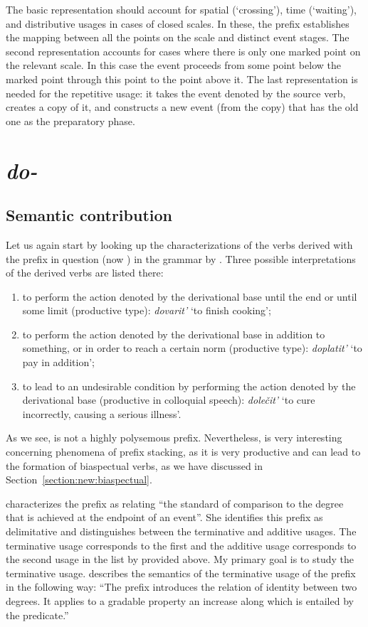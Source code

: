 The basic representation should account for spatial (`crossing'), time (`waiting'), and distributive usages in cases of closed scales. In these, the prefix establishes the mapping between all the points on the scale and distinct event stages. The second representation accounts for cases where there is only one marked point on the relevant scale. In this case the event proceeds from some point below the marked point through this point to the point above it. The last representation is needed for the repetitive usage: it takes the event denoted by the source verb, creates a copy of it, and constructs a new event (from the copy) that has the old one as the preparatory phase.

\section{\textit{do-}}\label{subsection:semantics:do}
\subsection{Semantic contribution}
Let us again start by looking up the characterizations of the verbs derived with the prefix in question (now ) in the grammar by \citet[357--358]{Shvedova:82}. Three possible interpretations of the derived verbs are listed there:
\begin{enumerate}
\item to perform the action denoted by the derivational base until the end or until some limit (productive type): \textit{dovarit'} `to finish cooking';
\item to perform the action denoted by the derivational base in addition to something, or in order to reach a certain norm (productive type): \textit{doplatit'} `to pay in addition';
\item to lead to an undesirable condition by performing the action denoted by the derivational base (productive in colloquial speech): \textit{dole\v{c}it'} `to cure incorrectly, causing a serious illness'.
\end{enumerate}

As we see,  is not a highly polysemous prefix. Nevertheless,  is very interesting concerning phenomena of prefix stacking, as it is very productive and can lead to the formation of biaspectual verbs, as we have discussed in Section~\ref{section:new:biaspectual}. 

\citet[70]{Kagan:book} characterizes the prefix  as relating ``the standard of comparison to the degree that is achieved at the endpoint of an event''. She identifies this prefix as delimitative and distinguishes between the terminative and additive  usages. The terminative usage corresponds to the first and the additive usage corresponds to the second usage in the list by \citet{Shvedova:82} provided above. My primary goal is to study the terminative usage. \citet[72]{Kagan:book} describes the semantics of the terminative usage of the prefix  in the following way: ``The prefix introduces the relation of identity between two degrees. It applies to a gradable property an increase along which is entailed by the predicate.''

